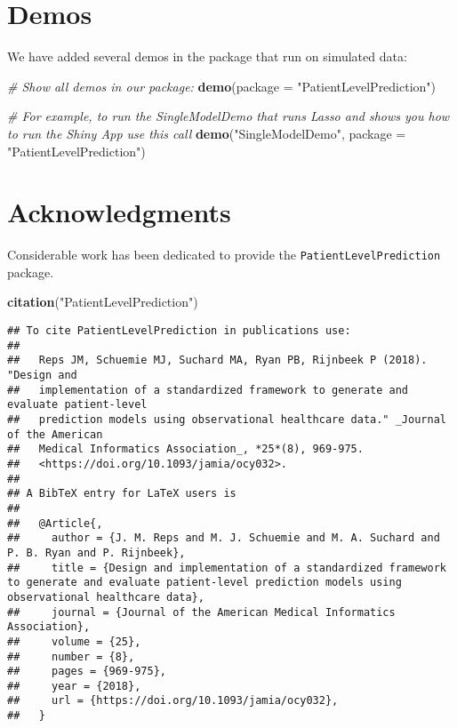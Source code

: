 \documentclass[
]{article}
\newenvironment{Shaded}{\begin{snugshade}}{\end{snugshade}}
\newcommand{\AttributeTok}[1]{\textcolor[rgb]{0.13,0.29,0.53}{#1}}
\newcommand{\CommentTok}[1]{\textcolor[rgb]{0.56,0.35,0.01}{\textit{#1}}}
\newcommand{\FunctionTok}[1]{\textcolor[rgb]{0.13,0.29,0.53}{\textbf{#1}}}
\newcommand{\NormalTok}[1]{#1}
\newcommand{\StringTok}[1]{\textcolor[rgb]{0.31,0.60,0.02}{#1}}
\begin{document}
\hypertarget{demos}{%
\section{Demos}\label{demos}}

We have added several demos in the package that run on simulated data:

\begin{Shaded}
\begin{Highlighting}[]
\CommentTok{\# Show all demos in our package: }
\FunctionTok{demo}\NormalTok{(}\AttributeTok{package =} \StringTok{"PatientLevelPrediction"}\NormalTok{)}

\CommentTok{\# For example, to run the SingleModelDemo that runs Lasso and shows you how to run the Shiny App use this call}
\FunctionTok{demo}\NormalTok{(}\StringTok{"SingleModelDemo"}\NormalTok{, }\AttributeTok{package =} \StringTok{"PatientLevelPrediction"}\NormalTok{)}
\end{Highlighting}
\end{Shaded}

\newpage

\hypertarget{acknowledgments}{%
\section{Acknowledgments}\label{acknowledgments}}

Considerable work has been dedicated to provide the
\texttt{PatientLevelPrediction} package.

\begin{Shaded}
\begin{Highlighting}[]
\FunctionTok{citation}\NormalTok{(}\StringTok{"PatientLevelPrediction"}\NormalTok{)}
\end{Highlighting}
\end{Shaded}

\begin{verbatim}
## To cite PatientLevelPrediction in publications use:
## 
##   Reps JM, Schuemie MJ, Suchard MA, Ryan PB, Rijnbeek P (2018). "Design and
##   implementation of a standardized framework to generate and evaluate patient-level
##   prediction models using observational healthcare data." _Journal of the American
##   Medical Informatics Association_, *25*(8), 969-975.
##   <https://doi.org/10.1093/jamia/ocy032>.
## 
## A BibTeX entry for LaTeX users is
## 
##   @Article{,
##     author = {J. M. Reps and M. J. Schuemie and M. A. Suchard and P. B. Ryan and P. Rijnbeek},
##     title = {Design and implementation of a standardized framework to generate and evaluate patient-level prediction models using observational healthcare data},
##     journal = {Journal of the American Medical Informatics Association},
##     volume = {25},
##     number = {8},
##     pages = {969-975},
##     year = {2018},
##     url = {https://doi.org/10.1093/jamia/ocy032},
##   }
\end{verbatim}
\end{document}
